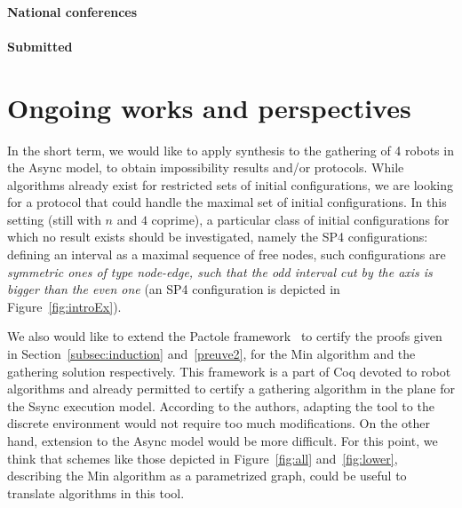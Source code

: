 \paragraph{National conferences}
\begin{refsection}
   \nocite{*}
   \printbibliography[title=Bibliographie,keyword=own,keyword=natc,resetnumbers,heading=none,sorting=ynt]
\end{refsection}
\paragraph{Submitted}
\begin{refsection}
   \nocite{*}
   \printbibliography[title=Bibliographie,keyword=own,keyword=sub,resetnumbers,heading=none,sorting=ynt]
\end{refsection}




\section*{Ongoing works and perspectives}

In the short term, we would like to apply synthesis to the gathering of 4 robots in the Async model, to obtain impossibility results and/or 
protocols. While algorithms already exist for restricted sets of initial configurations, we are looking for a protocol that could handle the maximal 
set of initial configurations.
In this setting (still with $n$ and $4$ coprime), a particular class of initial configurations for which no result exists should be investigated, 
namely the SP4 configurations: defining an interval as a  maximal sequence of free nodes, such configurations are 
\emph{symmetric ones of type node-edge, such that the odd interval cut by the axis is bigger than the even one} (an SP4 configuration is depicted in Figure~\ref{fig:introEx}). 

We also would like to extend the Pactole framework~\cite{CourtieuRTU15b} to certify the proofs given in Section~\ref{subsec:induction} and~\ref{preuve2}, for the Min algorithm and the gathering solution respectively. 
This framework is a part of Coq  devoted to robot algorithms and already permitted to certify a gathering algorithm in the plane 
for the Ssync execution model. According to the authors, adapting the tool to the discrete environment would not require too much modifications. 
On the other hand, extension to the Async model would be more difficult.
For this point, we think that schemes like those depicted in Figure~\ref{fig:all} and~\ref{fig:lower}, describing the Min algorithm as a 
parametrized graph, could be useful to translate algorithms in this tool.

